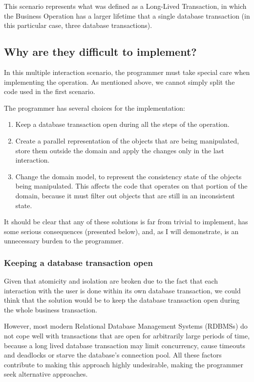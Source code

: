 \documentclass{llncs}
\begin{document}
This scenario represents what was defined as a Long-Lived Transaction,
in which the Business Operation has a larger lifetime that a single
database transaction (in this particular case, three database
transactions).

\subsection{Why are they difficult to implement?}
\label{sec:difficult}

In this multiple interaction scenario, the programmer must take
special care when implementing the operation. As mentioned above, we
cannot simply split the code used in the first scenario.

The programmer has several choices for the implementation:

\begin{enumerate}
\item Keep a database transaction open during all the steps of the
  operation.

\item Create a parallel representation of the objects that are being
  manipulated, store them outside the domain and apply the changes
  only in the last interaction.

\item Change the domain model, to represent the consistency state of
  the objects being manipulated. This affects the code that operates
  on that portion of the domain, because it must filter out objects
  that are still in an inconsistent state.
\end{enumerate}

It should be clear that any of these solutions is far from trivial to
implement, has some serious consequences (presented below), and, as I
will demonstrate, is an unnecessary burden to the programmer.

\subsubsection{Keeping a database transaction open}

Given that atomicity and isolation are broken due to the fact that
each interaction with the user is done within its own database
transaction, we could think that the solution would be to keep the
database transaction open during the whole business transaction.

However, most modern Relational Database Management Systems (RDBMSs)
do not cope well with transactions that are open for arbitrarily large
periods of time, because a long lived database transaction may limit
concurrency, cause timeouts and deadlocks or starve the database's
connection pool. All these factors contribute to making this approach
highly undesirable, making the programmer seek alternative approaches.
\end{document}

